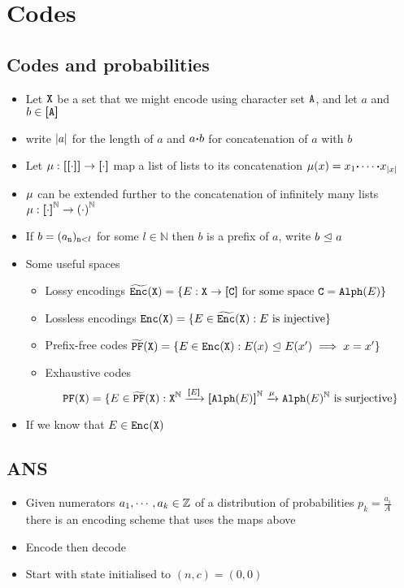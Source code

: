 \documentclass{article}
\begin{document}
      \section{Codes}
      \subsection{Codes and probabilities}
      \begin{itemize}
        \item
Let $\IN$ be a set that we might encode using character set $\TA$, and let $a$ and $b\in\LS$ 
        \item
          write ${|{a}|}$ for the length of $a$ and $a{\boldsymbol{\cdot}} b$ for concatenation of $a$ with $b$
        \item
          Let $\CONC:\LS[\LS[\cdot]]\rightarrow\LS[\cdot]$ map a list of lists to its concatenation $\CONC(\Feat)=\Feat_1\CC\cdots\CC\Feat_{\LEN{\Feat}}$
        \item
          ${\mu}$ can be extended further to the concatenation of infinitely many lists $\CONC:\LS[\cdot]^{\mathbb N}\rightarrow\left(\cdot\right)^{\SN}$
        \item
          If $b=(a_{\ind})_{\ind<l}$ for some $l\in\mathbb N$ then $b$ is a prefix of $a$, write $b{~\trianglelefteq~} a$
        \item Some useful spaces
          \begin{itemize}
            \item
              Lossy encodings $\LOSSY(\IN)=\{\ENC:\IN\rightarrow\LS[\T C]\text{ for some space }\T C=\ALPH(\ENC)\}$
            \item
              Lossless encodings $\CODE(\IN)=\{\ENC\in\LOSSY(\IN):\ENC\text{ is injective}\}$
            \item
              Prefix-free codes $\PFC(\IN)=\{\ENC\in\CODE(\IN):\ENC(\Feat)\SSTR\ENC(\FeatD)\implies \Feat=\FeatD\}$
            \item
              Exhaustive codes
              $$
              \PFO(\IN)=\{\ENC\in\PFC(\IN):\IN^{\SN}\xrightarrow{\LS[\ENC]}\LS[\ALPH(\ENC)]^{\SN}\xrightarrow{\mu}\ALPH(\ENC)^{\SN}\text{ is surjective}\}
              $$
          \end{itemize}
        \item
          If we know that $E\in\CODE(\IN)$ 

      \end{itemize}
      \subsection{ANS}
      \begin{itemize}
        \item
          Given numerators $a_1,\cdots,a_k\in{\mathbb{Z}}$ of a distribution of probabilities $p_k=\tfrac{a_i}{A}$ there is an encoding scheme that uses the maps above
        \item
          Encode then decode
        \item
          Start with state initialised to $(n,c)=(0,0)$
      \end{itemize}
\end{document}
